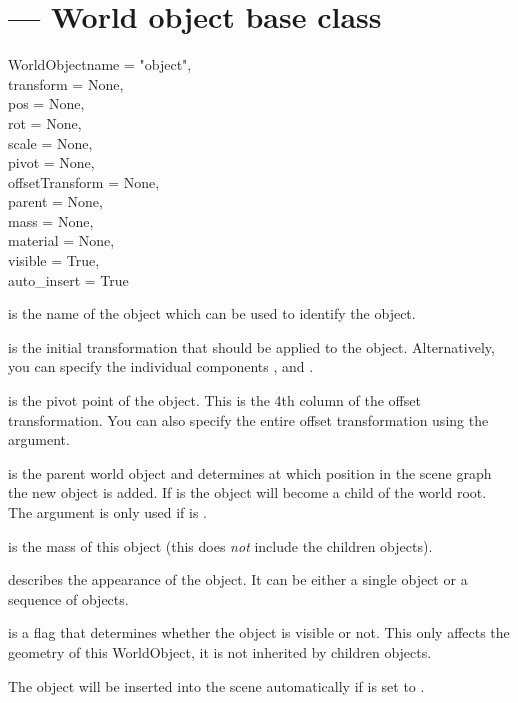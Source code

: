 
\section{ ---
         World object base class}

\begin{classdesc}{WorldObject}{name = "object", \\
                 transform = None,\\
                 pos = None, \\
	         rot = None,\\
                 scale = None,\\
                 pivot = None,\\
                 offsetTransform = None,\\
                 parent = None,\\
                 mass = None,\\
                 material = None,\\
                 visible = True,\\
                 auto_insert = True}

 is the name of the object which can be used to identify the
object.

 is the initial transformation that should be applied to
the object. Alternatively, you can specify the individual components
,  and .

 is the pivot point of the object. This is the 4th column of
the offset transformation. You can also specify the entire offset 
transformation using the  argument.

 is the parent world object and determines at which position
in the scene graph the new object is added. If  is 
the object will become a child of the world root. The  argument
is only used if  is .

 is the mass of this object (this does {\em not} include
the children objects).

 describes the appearance of the object. It can be either 
a single  object or a sequence of  objects.

 is a flag that determines whether the object is visible
or not. This only affects the geometry of this WorldObject, it is not
inherited by children objects.

The object will be inserted into the scene automatically if 
 is set to .
\end{classdesc}


